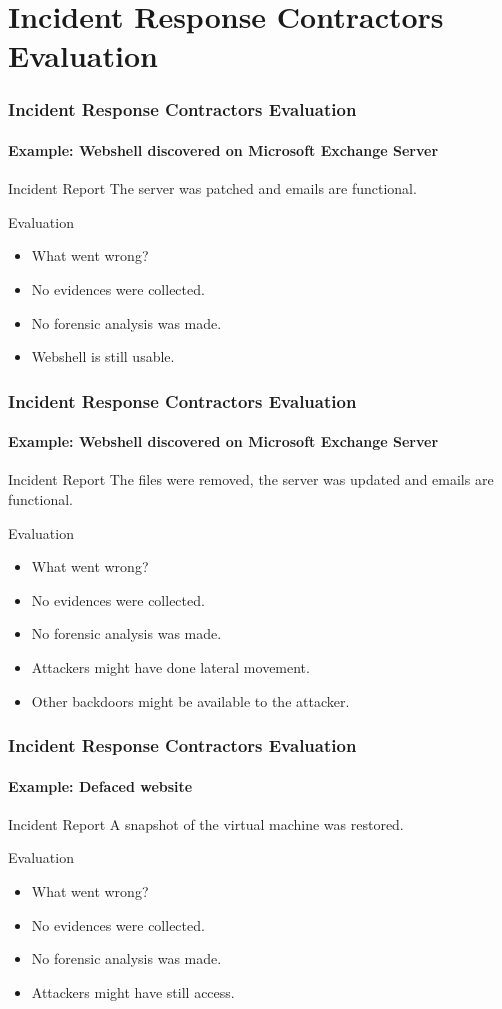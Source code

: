 \section{Incident Response Contractors Evaluation}
\begin{frame}	
	\frametitle{Incident Response Contractors Evaluation}
	\framesubtitle{Example: Webshell discovered on Microsoft Exchange Server}
	\begin{block}{Incident Report}
	The server was patched and emails are functional. 
	\end{block}
	\begin{block}{Evaluation}
		\begin{itemize}
  			\item What went wrong?
  			\pause
			\item No evidences were collected.
			\item No forensic analysis was made.
			\item Webshell is still usable.
		\end{itemize}
	\end{block}
\end{frame}



\begin{frame}	
	\frametitle{Incident Response Contractors Evaluation}
	\framesubtitle{Example: Webshell discovered on Microsoft Exchange Server}
	\begin{block}{Incident Report}
	The files were removed, the server was updated and emails are functional. 
	\end{block}
	\begin{block}{Evaluation}
		\begin{itemize}
  			\item What went wrong?
  			\pause
			\item No evidences were collected.
			\item No forensic analysis was made.
			\item Attackers might have done lateral movement.
			\item Other backdoors might be available to the attacker.
		\end{itemize}
	\end{block}
\end{frame}

\begin{frame}	
	\frametitle{Incident Response Contractors Evaluation}
	\framesubtitle{Example: Defaced website}
	\begin{block}{Incident Report}
		A snapshot of the virtual machine was restored.
	\end{block}
	\begin{block}{Evaluation}
		\begin{itemize}
  			\item What went wrong?
  			\pause
			\item No evidences were collected.
			\item No forensic analysis was made.
			\item Attackers might have still access.
		\end{itemize}
	\end{block}
\end{frame}

